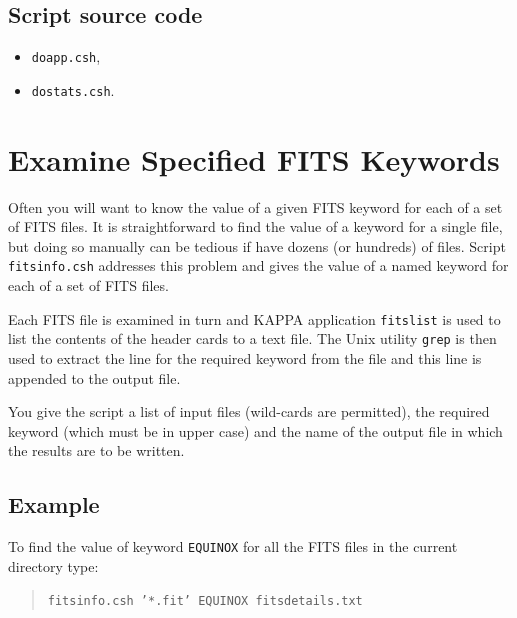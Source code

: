 \documentclass[twoside,11pt]{article}
\newcommand{\htmladdnormallink}[2]{#1}
\newcommand{\xref}[3]{#1}
\newcommand{\xlabel}[1]{}
\begin{document}
\begin{htmlonly}

\subsection*{Script source code}

\begin{itemize}

  \item \htmladdnormallink{{\tt doapp.csh}}{doapp.lis},

  \item \htmladdnormallink{{\tt dostats.csh}}{dostats.lis}.

\end{itemize}

\end{htmlonly}


\newpage
\section{\xlabel{FITSINFO}\label{FITSINFO}Examine Specified FITS Keywords}

Often you will want to know the value of a given FITS keyword for each
of a set of FITS files. It is straightforward to find the value of a
keyword for a single file, but doing so manually can be tedious if have
dozens (or hundreds) of files.  Script {\tt fitsinfo.csh} addresses this
problem and gives the value of a named keyword for each of a set of FITS
files.

Each FITS file is examined in turn and  \xref{KAPPA}{sun95}{} application
\xref{{\tt fitslist}}{sun95}{FITSLIST} is used to list the contents of
the header cards to a text file.  The Unix utility {\tt grep} is then
used to extract the line for the required keyword from the file and
this line is appended to the output file.

You give the script a list of input files (wild-cards are permitted),
the required keyword (which must be in upper case) and the name of the
output file in which the results are to be written.

\subsection*{Example}

To find the value of keyword {\tt EQUINOX} for all the FITS files in
the current directory type:

\begin{quote}
{\tt fitsinfo.csh '*.fit' EQUINOX fitsdetails.txt}
\end{quote}
\end{document}
